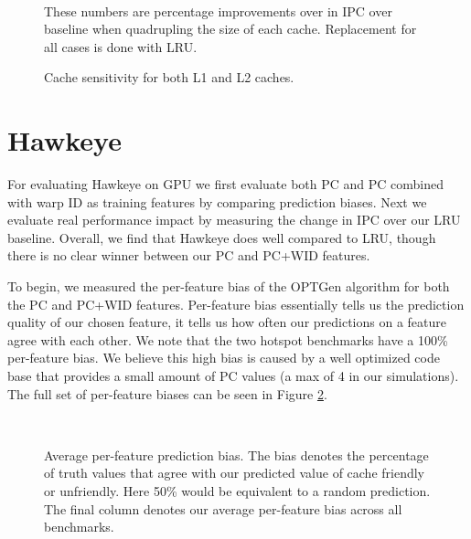 \begin{figure}[htb]
\begin{center}
\ 
\caption{Cache sensitivity for both L1 and L2 caches.} These numbers are percentage improvements over in IPC over baseline when quadrupling the size of each cache. Replacement for all cases is done with LRU.
\label{f:sensitivity}
\end{center}
\end{figure}
%

\section{Hawkeye}
For evaluating Hawkeye on GPU we first evaluate both PC and PC combined with warp ID as training features by comparing prediction biases. Next we evaluate real performance impact by measuring the change in IPC over our LRU baseline. Overall, we find that Hawkeye does well compared to LRU, though there is no clear winner between our PC and PC+WID features.

To begin, we measured the per-feature bias of the OPTGen algorithm for both the PC and PC+WID features. Per-feature bias essentially tells us the prediction quality of our chosen feature, it tells us how often our predictions on a feature agree with each other. We note that the two hotspot benchmarks have a 100\% per-feature bias. We believe this high bias is caused by a well optimized code base that provides a small amount of PC values (a max of 4 in our simulations). The full set of per-feature biases can be seen in Figure \ref{f:feature_bias}.

\begin{figure}[htb]
\begin{center}
\ 
\caption{Average per-feature prediction bias. The bias denotes the percentage of truth values that agree with our predicted value of cache friendly or unfriendly. Here 50\% would be equivalent to a random prediction. The final column denotes our average per-feature bias across all benchmarks.}
\label{f:feature_bias}
\end{center}
\end{figure}

